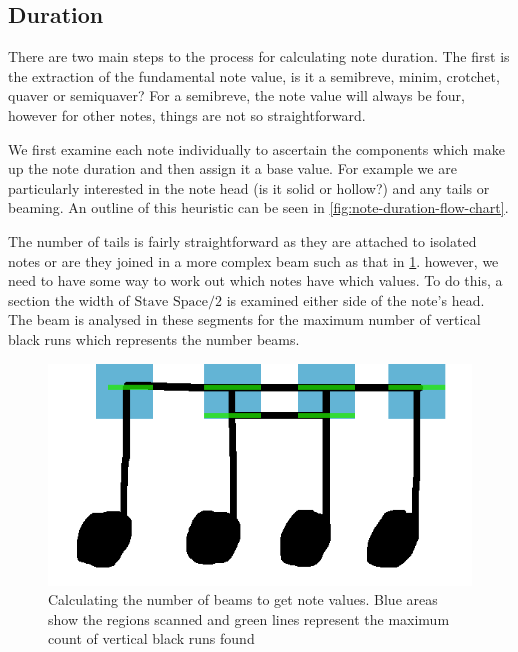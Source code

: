 \subsection{Duration}
\label{sec:duration-identification}

There are two main steps to the process for calculating note duration. The first is the extraction of the fundamental note value, is it a semibreve, minim, crotchet, quaver or semiquaver? For a  semibreve, the note value will always be four, however for other notes, things are not so straightforward.

We first examine each note individually to ascertain the components which make up the note duration and then assign it a base value. For example we are particularly interested in the note head (is it solid or hollow?) and any tails or beaming. An outline of this heuristic can be seen in \cref{fig:note-duration-flow-chart}.

The number of tails is fairly straightforward as they are attached to isolated notes or are they joined in a more complex beam such as that in \cref{fig:complex-beam-establish}. however, we need to have some way to work out which notes have which values. To do this, a section the width of $\text{Stave Space} / 2$ is examined either side of the note's head. The beam is analysed in these segments for the maximum number of vertical black runs which represents the number beams.

\begin{figure}[H]
  \includegraphics[width=\linewidth]{gfx/implementation/beam-identification.png}
  \caption{Calculating the number of beams to get note values. Blue areas show the regions scanned and green lines represent the maximum count of vertical black runs found}
  \label{fig:complex-beam-establish}
\end{figure}

